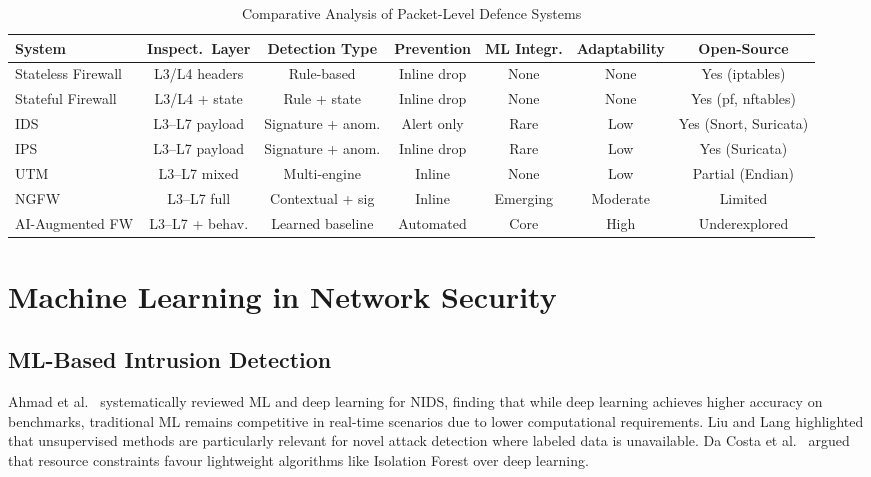 \documentclass[conference]{IEEEtran}
\begin{document}
\begin{table}[!t]
\centering
\caption{Comparative Analysis of Packet-Level Defence Systems}
\label{tab:comparative}
\renewcommand{\arraystretch}{1.15}
\small
\begin{tabularx}{\textwidth}{l|c|c|c|c|c|c}
\toprule
\textbf{System} & \textbf{Inspect.\ Layer} & \textbf{Detection Type} & \textbf{Prevention} & \textbf{ML Integr.} & \textbf{Adaptability} & \textbf{Open-Source} \\
\midrule
Stateless Firewall    & L3/L4 headers    & Rule-based         & Inline drop  & None      & None       & Yes (iptables) \\
Stateful Firewall     & L3/L4 + state    & Rule + state       & Inline drop  & None      & None       & Yes (pf, nftables) \\
IDS                   & L3--L7 payload   & Signature + anom.  & Alert only   & Rare      & Low        & Yes (Snort, Suricata) \\
IPS                   & L3--L7 payload   & Signature + anom.  & Inline drop  & Rare      & Low        & Yes (Suricata) \\
UTM                   & L3--L7 mixed     & Multi-engine       & Inline       & None      & Low        & Partial (Endian) \\
NGFW                  & L3--L7 full      & Contextual + sig   & Inline       & Emerging  & Moderate   & Limited \\
AI-Augmented FW       & L3--L7 + behav.  & Learned baseline   & Automated    & Core      & High       & Underexplored \\
\bottomrule
\end{tabularx}
\end{table}

\section{Machine Learning in Network Security}
\label{sec:ml}

\subsection{ML-Based Intrusion Detection}

Ahmad et al.\ \cite{ahmad2021nids} systematically reviewed ML and deep learning for NIDS, finding that while deep learning achieves higher accuracy on benchmarks, traditional ML remains competitive in real-time scenarios due to lower computational requirements. Liu and Lang \cite{liu2019mlids} highlighted that unsupervised methods are particularly relevant for novel attack detection where labeled data is unavailable. Da Costa et al.\ \cite{dacosta2019iot} argued that resource constraints favour lightweight algorithms like Isolation Forest over deep learning.
\end{document}
